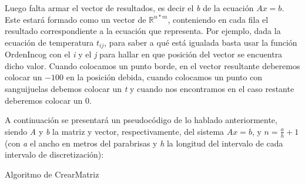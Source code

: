 \documentclass[10pt, a4paper]{article}
\begin{document}
	Luego falta armar el vector de resultados, es decir el \textit{b} de la ecuaci\'on $Ax=b$. Este estar\'a formado como un vector de $\mathbb{R}^{n*m}$, conteniendo en cada fila el resultado correspondiente a la ecuaci\'on que representa. Por ejemplo, dada la ecuaci\'on de temperatura $t_{ij}$, para saber a qu\'e est\'a igualada basta usar la funci\'on OrdenIncog con el \textit{i} y el \textit{j} para hallar en que posici\'on del vector se encuentra dicho valor. Cuando colocamos un punto borde, en el vector resultante deberemos colocar un $-100$ en la posici\'on debida, cuando colocamos un punto con sanguijuelas debemos colocar un \textit{t} y cuando nos encontramos en el caso restante deberemos colocar un $0$. 
	
	A continuaci\'on se presentar\'a un pseudoc\'odigo de lo hablado anteriormente, siendo \textit{A} y \textit{b} la matriz y vector, respectivamente, del sistema $Ax=b$, y $n=\frac{a}{h}+1$ (con \textit{a} el ancho en metros del parabrisas y \textit{h} la longitud del intervalo de cada intervalo de discretizaci\'on):

\begin{algorithm}[H]
\caption{Algoritmo de CrearMatriz}
\end{algorithm} 
	
\end{document}
